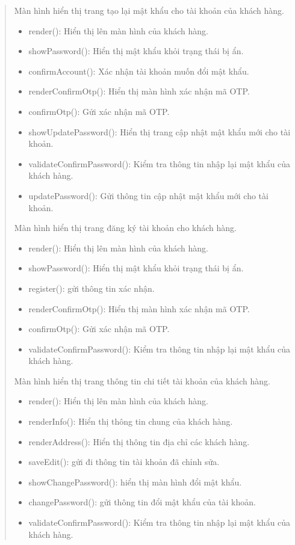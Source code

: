 \begin{quote}
		Màn hình hiển thị trang tạo lại mật khẩu cho tài khoản của khách hàng.
		\begin{itemize}
			\item render(): Hiển thị lên màn hình của khách hàng.
			\item showPassword(): Hiển thị mật khẩu khỏi trạng thái bị ẩn.
			\item confirmAccount(): Xác nhận tài khoản muốn đổi mật khẩu.
			\item renderConfirmOtp(): Hiển thị màn hình xác nhận mã OTP.
			\item confirmOtp(): Gửi xác nhận mã OTP.
			\item showUpdatePassword(): Hiển thị trang cập nhật mật khẩu mới cho tài khoản.
			\item validateConfirmPassword(): Kiểm tra thông tin nhập lại mật khẩu của khách hàng.
			\item updatePassword(): Gửi thông tin cập nhật mật khẩu mới cho tài khoản.
		\end{itemize}
		Màn hình hiển thị trang đăng ký tài khoản cho khách hàng.
		\begin{itemize}
			\item render(): Hiển thị lên màn hình của khách hàng.
			\item showPassword(): Hiển thị mật khẩu khỏi trạng thái bị ẩn.
			\item register(): gửi thông tin xác nhận.
			\item renderConfirmOtp(): Hiển thị màn hình xác nhận mã OTP.
			\item confirmOtp(): Gửi xác nhận mã OTP.
			\item validateConfirmPassword(): Kiểm tra thông tin nhập lại mật khẩu của khách hàng.
		\end{itemize}
		Màn hình hiển thị trang thông tin chi tiết tài khoản của khách hàng.
		\begin{itemize}
			\item render(): Hiển thị lên màn hình của khách hàng.
			\item renderInfo(): Hiển thị thông tin chung của khách hàng.
			\item renderAddress(): Hiển thị thông tin địa chỉ các khách hàng.
			\item saveEdit(): gửi đi thông tin tài khoản đã chỉnh sửa.
			\item showChangePassword(): hiển thị màn hình đổi mật khẩu.
			\item changePassword(): gửi thông tin đổi mật khẩu của tài khoản.
			\item validateConfirmPassword(): Kiểm tra thông tin nhập lại mật khẩu của khách hàng.
		\end{itemize}
	
\end{quote}

